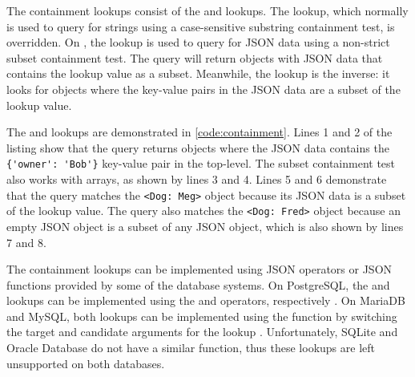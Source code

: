 \noindent
\begin{minipage}{\linewidth}

\end{minipage}

\noindent
\begin{minipage}{\linewidth}

\end{minipage}

The containment lookups consist of the  and 
lookups. The  lookup, which normally is used to query for
strings using a case-sensitive substring containment test, is overridden. On
, the lookup is used to query for JSON data using a non-strict
subset containment test. The query will return objects with JSON data that
contains the lookup value as a subset. Meanwhile, the 
lookup is the inverse: it looks for objects where the key-value pairs in the
JSON data are a subset of the lookup value.

The  and  lookups are demonstrated in
\autoref{code:containment}. Lines 1 and 2 of the listing show that the query
returns objects where the JSON data contains the \verb|{'owner': 'Bob'}|
key-value pair in the top-level. The subset containment test also works with
arrays, as shown by lines 3 and 4. Lines 5 and 6 demonstrate that the query
matches the \verb|<Dog: Meg>| object because its JSON data is a subset of the
lookup value. The query also matches the \verb|<Dog: Fred>| object because an
empty JSON object is a subset of any JSON object, which is also shown by lines
7 and 8.

The containment lookups can be implemented using JSON operators or JSON
functions provided by some of the database systems. On PostgreSQL, the
 and  lookups can be implemented using the
 and  operators, respectively \cite{postgres:json_operators}.
On MariaDB and MySQL, both lookups can be implemented using the
 function by switching the target and candidate arguments
for the  lookup \cite{mariadb:json_contains,
mysql:json_search}. Unfortunately, SQLite and Oracle Database do not have a
similar function, thus these lookups are left unsupported on both databases.

